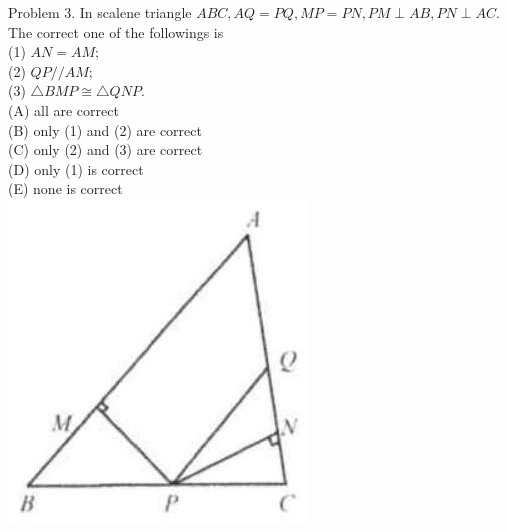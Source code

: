 \documentclass[10pt]{article}
\begin{document}
Problem 3. In scalene triangle \(A B C, A Q=P Q, M P=P N, P M \perp A B, P N \perp A C\). The correct one of the followings is\\
(1) \(A N=A M\);\\
(2) \(Q P / / A M\);\\
(3) \(\triangle B M P \cong \triangle Q N P\).\\
(A) all are correct\\
(B) only (1) and (2) are correct\\
(C) only (2) and (3) are correct\\
(D) only (1) is correct\\
(E) none is correct\\
\includegraphics[max width=\textwidth, center]{2025_04_17_97bc1f7e44d93c271a88g-064(3)}
\end{document}
